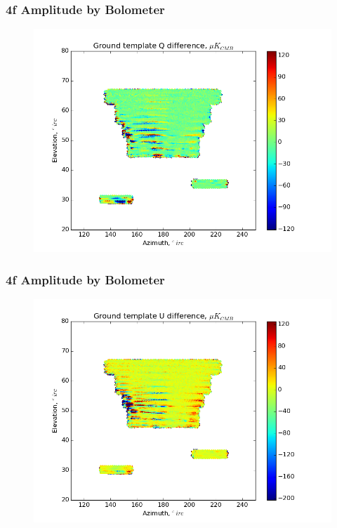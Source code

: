 \documentclass{beamer}
\begin{document}
\begin{frame}
\frametitle{4f Amplitude by Bolometer}
\begin{figure}
\includegraphics[width=0.9\linewidth]{dQ_gt_AMP_4F_BY_BOLO.png}
\end{figure}
\end{frame}

\begin{frame}
\frametitle{4f Amplitude by Bolometer}
\begin{figure}
\includegraphics[width=0.9\linewidth]{dU_gt_AMP_4F_BY_BOLO.png}
\end{figure}
\end{frame}
\end{document}
